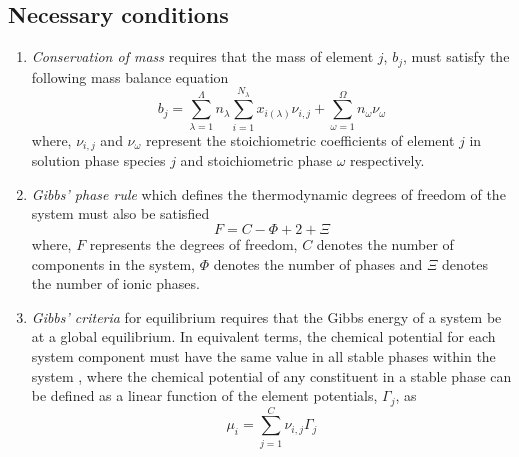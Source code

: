 	\subsection{Necessary conditions}
    	\begin{enumerate}\compresslist
        		\item \emph{Conservation of mass} requires that the mass of element $j$, $b_j$, must satisfy the following mass balance equation
            	\begin{equation}
                		b_j = \sum_{\lambda=1}^{\Lambda} n_{\lambda}\sum_{i=1}^{N_{\lambda}}x_{i({\lambda})}{\nu}_{i,j} +  \sum_{\omega=1}^{\Omega} n_{\omega}{\nu}_{\omega}
            	\end{equation}
            	where, ${\nu}_{i,j}$ and ${\nu}_{\omega}$ represent the stoichiometric coefficients of element $j$ in solution phase species $j$ and stoichiometric phase $\omega$ respectively.
        		\item \emph{Gibbs' phase rule} which defines the thermodynamic degrees of freedom of the system must also be     satisfied
            	\begin{equation}
                		F=C-\Phi + 2 + \Xi
            	\end{equation}
            	where, $F$ represents the degrees of freedom, $C$ denotes the number of components in the system, $\Phi$ denotes the number of phases and $\Xi$ denotes the number of ionic phases.
        		\item \emph{Gibbs' criteria} for equilibrium requires that the Gibbs energy of a system be at a global equilibrium. In equivalent terms, the chemical potential for each system component must have the same value in all stable phases within the system \cite{HILLERT198131}, where the chemical potential of any constituent in a stable phase can be defined as a linear function of the element potentials, $\Gamma_j$, as
            	\begin{equation}
		        \mu_{i} = \sum_{j=1}^C \nu_{i,j} \Gamma_j
            	\end{equation}
    	\end{enumerate}

